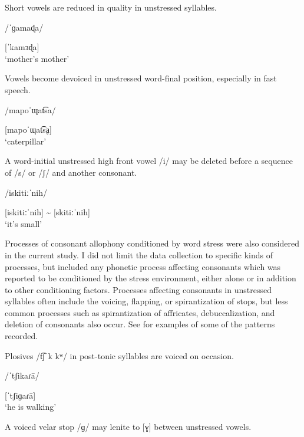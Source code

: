 \ea\label{ex:5.15}

Short vowels are reduced in quality in unstressed syllables.

/\textsf{ˈ}ɡamaɖa/

[\textsf{ˈ}kamɜɖa]\\
\glt ‘mother’s mother’
\citep[88--90]{Bowern2012}
\z

\ea\label{ex:5.16}

Vowels become devoiced in unstressed word-final position, especially in fast speech.

/mapoˈɰat͡sa/

[mapoˈɰat͡sḁ]\\
\glt ‘caterpillar’
\citep[60--61]{Facundes2000}
\z

\ea\label{ex:5.17}

A word-initial unstressed high front vowel /i/ may be deleted before a sequence of /s/ or /ʃ/ and another consonant.

/iskitiːˈnih/

[iskitiːˈnih] {\textasciitilde} [skitiːˈnih]\\
\glt ‘it’s small’
\citep[19]{Broadwell2006}
\z

  Processes of consonant allophony conditioned by word stress were also considered in the current study. I did not limit the data collection to specific kinds of processes, but included any phonetic process affecting consonants which was reported to be conditioned by the stress environment, either alone or in addition to other conditioning factors. Processes affecting consonants in unstressed syllables often include the voicing, flapping, or spirantization of stops, but less common processes such as spirantization of affricates, debuccalization, and deletion of consonants also occur. See  for examples of some of the patterns recorded.\pagebreak

\ea\label{ex:5.18}

Plosives /t͡ʃ k kʷ/ in post-tonic syllables are voiced on occasion.

/ˈtʃikaɾ\={a}/

[ˈtʃiɡaɾ\={a}]\\
\glt ‘he is walking’
\citep[5]{Bradley1970}
\z

\ea\label{ex:5.19}

A voiced velar stop /ɡ/ may lenite to [ɣ] between unstressed vowels.

